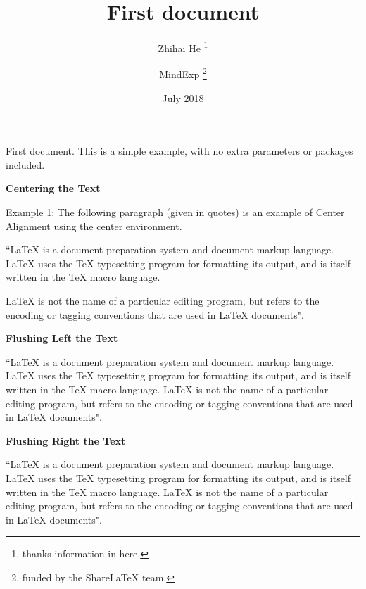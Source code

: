 \documentclass[12pt, letterpaper]{article}
\title{First document}
\author{Zhihai He \thanks{thanks information in here.} \and MindExp \thanks{funded by the ShareLaTeX team.}}
\date{July 2018}
\begin{document}
\begin{titlepage}	%
\maketitle
\end{titlepage}

\tableofcontents

First document. This is a simple example, with no 	%
extra parameters or packages included.

\textbf{Centering the Text}

\begin{center}	%
Example 1: The following paragraph (given in quotes) is an 
example of Center Alignment using the center environment. 

``LaTeX is a document preparation system and document markup 
language. LaTeX uses the TeX typesetting program for formatting 
its output, and is itself written in the TeX macro language. \par	%
LaTeX is not the name of a particular editing program, but 
refers to the encoding or tagging conventions that are used 
in LaTeX documents".
\end{center}

\textbf{Flushing Left the Text}

\begin{flushleft}
``LaTeX is a document preparation system and document markup 
language. LaTeX uses the TeX typesetting program for formatting 
its output, and is itself written in the TeX macro language. 
LaTeX is not the name of a particular editing program, but refers 
to the encoding or tagging conventions that are used in LaTeX documents".
\end{flushleft}

\textbf{Flushing Right the Text}

\begin{flushright}
``LaTeX is a document preparation system and document markup 
language. LaTeX uses the TeX typesetting program for formatting 
its output, and is itself written in the TeX macro language. 
LaTeX is not the name of a particular editing program, but refers 
to the encoding or tagging conventions that are used in LaTeX documents".
\end{flushright}
\end{document}
